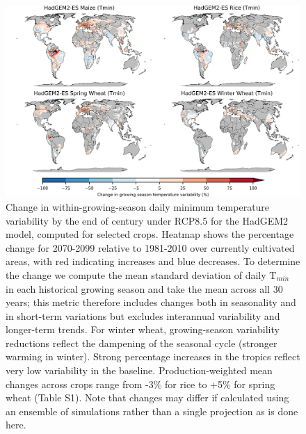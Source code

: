 \documentclass[12pt]{article}
\begin{document}
\begin{figure}[h!]
  \centering
  \includegraphics[width = 14cm]{HadGEM2-ES_var_change_min.png}
  \caption{
	  Change in within-growing-season daily minimum temperature variability by the end of century under RCP8.5 for the HadGEM2 model, computed for selected crops. 
	Heatmap shows the percentage change for 2070-2099 relative to 1981-2010 over currently cultivated areas, with red indicating increases and blue decreases. 
	To determine the change we compute the mean standard deviation of daily T$_{min}$ in each historical growing season and take the mean across all 30 years; this metric therefore includes changes both in seasonality and in short-term variations but excludes interannual variability and longer-term trends. For winter wheat, growing-season variability reductions reflect the dampening of the seasonal cycle (stronger warming in winter). 
	Strong percentage increases in the tropics reflect very low variability in the baseline. Production-weighted mean changes across crops range from -3\% for rice to +5\% for spring wheat (Table S1). Note that changes may differ if calculated using an ensemble of simulations rather than a single projection as is done here.
  }
  \label{fig:var}
\end{figure}
\end{document}
